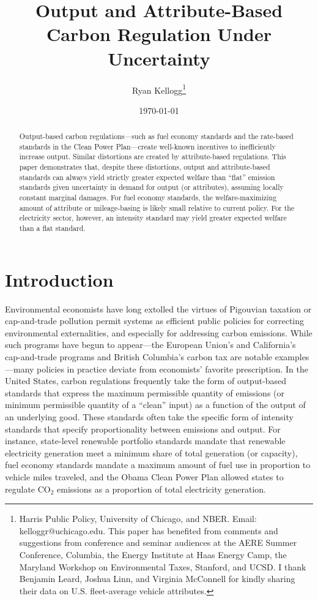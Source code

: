 \documentclass[12pt]{article}
\title{Output and Attribute-Based Carbon Regulation Under Uncertainty}
\author{Ryan Kellogg\footnote{Harris Public Policy, University of Chicago, and NBER. Email: kelloggr@uchicago.edu. This paper has benefited from comments and suggestions from conference and seminar audiences at the AERE Summer Conference, Columbia, the Energy Institute at Haas Energy Camp, the Maryland Workshop on Environmental Taxes, Stanford, and UCSD. I thank Benjamin Leard, Joshua Linn, and Virginia McConnell for kindly sharing their data on U.S. fleet-average vehicle attributes.}}
\date{\today}
\begin{document}

\maketitle

\thispagestyle{empty}	


\begin{abstract}
Output-based carbon regulations---such as fuel economy standards and the rate-based standards in the Clean Power Plan---create well-known incentives to inefficiently increase output. Similar distortions are created by attribute-based regulations. This paper demonstrates that, despite these distortions, output and attribute-based standards can always yield strictly greater expected welfare than ``flat'' emission standards given uncertainty in demand for output (or attributes), assuming locally constant marginal damages. For fuel economy standards, the welfare-maximizing amount of attribute or mileage-basing is likely small relative to current policy. For the electricity sector, however, an intensity standard may yield greater expected welfare than a flat standard.
\end{abstract}


\newpage


\doublespace

\section{Introduction \label{sec:Intro}}

Environmental economists have long extolled the virtues of Pigouvian taxation or cap-and-trade pollution permit systems as efficient public policies for correcting environmental externalities, and especially for addressing carbon emissions. While such programs have begun to appear---the European Union's and California's cap-and-trade programs and British Columbia's carbon tax are notable examples---many policies in practice deviate from economists' favorite prescription. In the United States, carbon regulations frequently take the form of output-based standards that express the maximum permissible quantity of emissions (or minimum permissible quantity of a ``clean'' input) as a function of the output of an underlying good. These standards often take the specific form of intensity standards that specify proportionality between emissions and output. For instance, state-level renewable portfolio standards mandate that renewable electricity generation meet a minimum share of total generation (or capacity), fuel economy standards mandate a maximum amount of fuel use in proportion to vehicle miles traveled, and the Obama Clean Power Plan allowed states to regulate CO$_{\text{2}}$ emissions as a proportion of total electricity generation.
\end{document}
